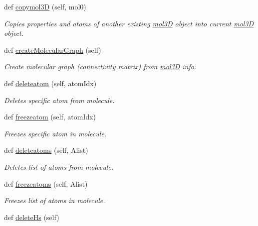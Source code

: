 \begin{DoxyCompactItemize}
def \hyperlink{classmolSimplify_1_1Classes_1_1mol3D_1_1mol3D_a09b722d1243e562169a88a591812a2ed}{copymol3D} (self, mol0)
\begin{DoxyCompactList}\small\item\em Copies properties and atoms of another existing \hyperlink{classmolSimplify_1_1Classes_1_1mol3D_1_1mol3D}{mol3D} object into current \hyperlink{classmolSimplify_1_1Classes_1_1mol3D_1_1mol3D}{mol3D} object. \end{DoxyCompactList}\item 
def \hyperlink{classmolSimplify_1_1Classes_1_1mol3D_1_1mol3D_afa77b09b79aeb68ed3b50b51987c61dc}{create\+Molecular\+Graph} (self)
\begin{DoxyCompactList}\small\item\em Create molecular graph (connectivity matrix) from \hyperlink{classmolSimplify_1_1Classes_1_1mol3D_1_1mol3D}{mol3D} info. \end{DoxyCompactList}\item 
def \hyperlink{classmolSimplify_1_1Classes_1_1mol3D_1_1mol3D_a6838664445a9896c703e0ffe2542ceef}{deleteatom} (self, atom\+Idx)
\begin{DoxyCompactList}\small\item\em Deletes specific atom from molecule. \end{DoxyCompactList}\item 
def \hyperlink{classmolSimplify_1_1Classes_1_1mol3D_1_1mol3D_a3d0541772724aa1a54e8cb6c8de77ea7}{freezeatom} (self, atom\+Idx)
\begin{DoxyCompactList}\small\item\em Freezes specific atom in molecule. \end{DoxyCompactList}\item 
def \hyperlink{classmolSimplify_1_1Classes_1_1mol3D_1_1mol3D_a98613e0d849dd341b6cec837877e214b}{deleteatoms} (self, Alist)
\begin{DoxyCompactList}\small\item\em Deletes list of atoms from molecule. \end{DoxyCompactList}\item 
def \hyperlink{classmolSimplify_1_1Classes_1_1mol3D_1_1mol3D_a629f2ff84af7df7a809fe5e8f879f6a3}{freezeatoms} (self, Alist)
\begin{DoxyCompactList}\small\item\em Freezes list of atoms in molecule. \end{DoxyCompactList}\item 
def \hyperlink{classmolSimplify_1_1Classes_1_1mol3D_1_1mol3D_a91e56cc05405772f174a4eda98d86f41}{delete\+Hs} (self)

\end{DoxyCompactItemize}

